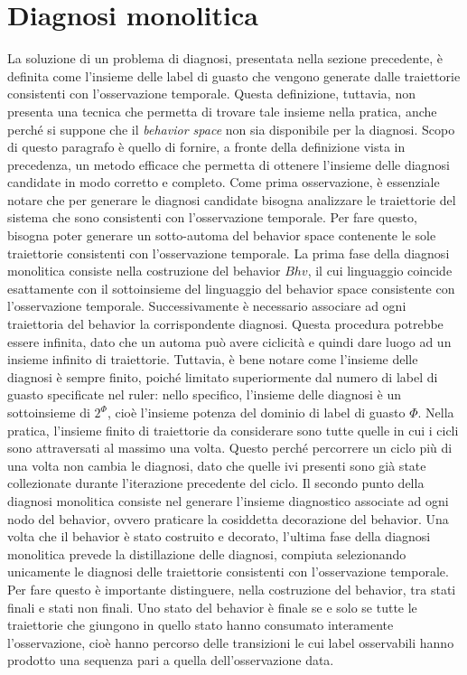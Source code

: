 \section{Diagnosi monolitica}
La soluzione di un problema di  diagnosi, presentata nella sezione precedente, è definita come l'insieme delle label di guasto che vengono generate dalle traiettorie consistenti con l'osservazione temporale. Questa definizione, tuttavia, non presenta una tecnica che permetta di trovare tale insieme nella pratica, anche perché si suppone che il \emph{behavior space} non sia disponibile per la diagnosi. Scopo di questo paragrafo è quello di fornire, a fronte della definizione vista in precedenza, un metodo efficace che permetta di ottenere l'insieme delle diagnosi candidate in modo corretto e completo. 
Come prima osservazione, è essenziale notare che per generare le diagnosi candidate bisogna analizzare le traiettorie del sistema che sono consistenti con l'osservazione temporale. Per fare questo, bisogna poter generare un sotto-automa del behavior space contenente le sole traiettorie consistenti con l'osservazione temporale. 
La prima fase della diagnosi monolitica consiste nella costruzione del behavior $Bhv$, il cui linguaggio coincide esattamente con il sottoinsieme del linguaggio del behavior space consistente con l'osservazione temporale. Successivamente è necessario associare ad ogni traiettoria del behavior la corrispondente diagnosi. Questa procedura potrebbe essere infinita, dato che un automa può avere ciclicità e quindi dare luogo ad un insieme infinito di traiettorie. Tuttavia, è bene notare come l'insieme delle diagnosi è sempre finito, poiché limitato superiormente dal numero di label di guasto specificate nel ruler: nello specifico, l'insieme delle diagnosi è un sottoinsieme di $2^\Phi$, cioè l'insieme potenza del dominio di label di guasto $\Phi$. Nella pratica, l'insieme finito di traiettorie da considerare sono tutte quelle in cui i cicli sono attraversati al massimo una volta. Questo perché percorrere un ciclo più di una volta non cambia le diagnosi, dato che quelle ivi presenti sono già state collezionate durante l'iterazione precedente del ciclo.
Il secondo punto della diagnosi monolitica consiste nel generare l'insieme diagnostico associate ad ogni nodo del behavior, ovvero praticare la cosiddetta decorazione del behavior.
Una volta che il behavior è stato costruito e decorato, l'ultima fase della diagnosi monolitica prevede la distillazione delle diagnosi, compiuta selezionando unicamente le diagnosi delle traiettorie consistenti con l'osservazione temporale. Per fare questo è importante distinguere, nella costruzione del behavior, tra stati finali e stati non finali. Uno stato del behavior è finale se e solo se tutte le traiettorie che giungono in quello stato hanno consumato interamente l'osservazione, cioè hanno percorso delle transizioni le cui label osservabili hanno prodotto una sequenza pari a quella dell'osservazione data. 

